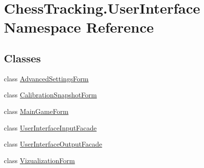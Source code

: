 \hypertarget{namespace_chess_tracking_1_1_user_interface}{}\section{Chess\+Tracking.\+User\+Interface Namespace Reference}
\label{namespace_chess_tracking_1_1_user_interface}
\subsection*{Classes}
\begin{DoxyCompactItemize}
\item 
class \mbox{\hyperlink{class_chess_tracking_1_1_user_interface_1_1_advanced_settings_form}{Advanced\+Settings\+Form}}
\item 
class \mbox{\hyperlink{class_chess_tracking_1_1_user_interface_1_1_calibration_snapshot_form}{Calibration\+Snapshot\+Form}}
\item 
class \mbox{\hyperlink{class_chess_tracking_1_1_user_interface_1_1_main_game_form}{Main\+Game\+Form}}
\item 
class \mbox{\hyperlink{class_chess_tracking_1_1_user_interface_1_1_user_interface_input_facade}{User\+Interface\+Input\+Facade}}
\item 
class \mbox{\hyperlink{class_chess_tracking_1_1_user_interface_1_1_user_interface_output_facade}{User\+Interface\+Output\+Facade}}
\item 
class \mbox{\hyperlink{class_chess_tracking_1_1_user_interface_1_1_vizualization_form}{Vizualization\+Form}}
\end{DoxyCompactItemize}
